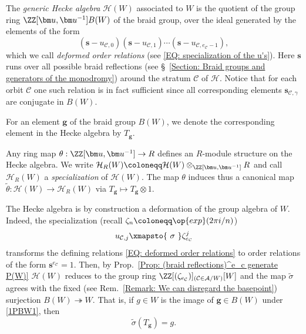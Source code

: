 \begin{defi}\label{Defn: Hecke algebra}
The \emph{generic Hecke algebra} $\mathcal{H}(W)$ associated to $W$ is the quotient of the group ring $\ZZ[\bm u,\bm u^{-1}]B(W)$ of the braid group, over the ideal generated by the elements of the form \begin{equation}
(\bm s-u_{\mathcal{C},0})(\bm s-u_{\mathcal{C},1})\cdots (\bm s-u_{\mathcal{C},e_{\mathcal{C}}-1}),\label{EQ: deformed order relations}\end{equation}
which we call \emph{deformed order relations} \textup{(}see \eqref{EQ: specialization of the u's}\textup{)}. Here $\bm s$ runs over all possible braid reflections \textup{(}see \S~\ref{Section: Braid groups and generators of the monodromy}\textup{)} around the stratum $\mathcal{C}$ of $\mathcal{H}$. Notice that for each orbit $\mathcal{C}$ one such relation is in fact sufficient since all corresponding elements $\bm s_{\mathcal{C},\gamma}$ are conjugate in $B(W)$. 
\end{defi}

\begin{nota}
For an element $\bm g$ of the braid group $B(W)$, we denote the corresponding element in the Hecke algebra by $T_{\bm g}$.
\end{nota}

Any ring map $\theta:\ZZ[\bm u,\bm u^{-1}]\rightarrow R$ defines an $R$-module structure on the Hecke algebra. We write $\mathcal{H}_R(W)\coloneqq \mathcal{H}(W)\otimes_{\ZZ[\bm u,\bm u^{-1}]}R$ and call $\mathcal{H}_R(W)$  a {\it \color{blue} specialization} of $\mathcal{H}(W)$. The map $\theta$ induces thus a canonical map $\tilde{\theta}: \mathcal{H}(W)\rightarrow \mathcal{H}_R(W)$ via $T_{\bm g}\mapsto T_{\bm g}\otimes 1$. 

The Hecke algebra is by construction a deformation of the group algebra of $W$.  Indeed, the specialization (recall $\zeta_n\coloneqq \op{exp}(2\pi i /n)$) \begin{equation}
u_{\mathcal{C},j}\xmapsto{\displaystyle \ \sigma \ } \zeta_{e_{\mathcal{C}}}^j \label{EQ: specialization of the u's}\end{equation} transforms the defining relations \eqref{EQ: deformed order relations} to order relations of the form $\bm s^{e_{\mathcal{C}}}=1$. Then, by Prop.~\ref{Prop: (braid reflections)^e_c generate P(W)} $\mathcal{H}(W)$ reduces to the group ring $\ZZ[(\zeta_{e_{\mathcal{C}}})]_{(\mathcal{C}\in\mathcal{A}/W)}[W]$ and the map $\tilde{\sigma}$ agrees with the fixed (see Rem.~\ref{Remark: We can disregard the basepoint}) surjection $B(W)\twoheadrightarrow W$. That is, if $g\in W$ is the image of $\bm g\in B(W)$ under \eqref{1PBW1}, then $$\tilde{\sigma}(T_{\bm g})=g.$$



